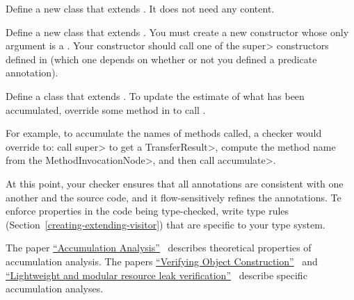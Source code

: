 
Define a new class that extends .
It does not need any content.

Define a new class that extends .
You must create a new constructor whose only argument is a .
Your constructor should call one of the \<super> constructors defined in
 (which one depends on whether or not
you defined a predicate annotation).



Define a class that extends .
To update the estimate of what has been accumulated, override some method in
 to call
.

For example, to accumulate the names of methods called, a checker would override
 to:
call \<super> to get a \<TransferResult>, compute the method name from the \<MethodInvocationNode>,
and then call \<accumulate>.



At this point, your checker ensures that all annotations are consistent
with one another and the source code, and it flow-sensitively refines the
annotations.
Te enforce properties in the code being type-checked, write type rules
(Section~\ref{creating-extending-visitor}) that are specific to your type
system.



The paper
\href{https://homes.cs.washington.edu/~mernst/pubs/accumulation-analysis-ecoop2022.pdf}{``Accumulation
  Analysis''}~\cite{KelloggSSE2022} describes theoretical properties of
accumulation analysis.  The papers
\href{https://homes.cs.washington.edu/~mernst/pubs/object-construction-icse2020.pdf}{``Verifying
  Object Construction''}~\cite{KelloggRSSE2020} and
\href{https://homes.cs.washington.edu/~mernst/pubs/resource-leak-esecfse2021.pdf}{``Lightweight
  and modular resource leak verification''}~\cite{KelloggSSE2021} describe
specific accumulation analyses.


